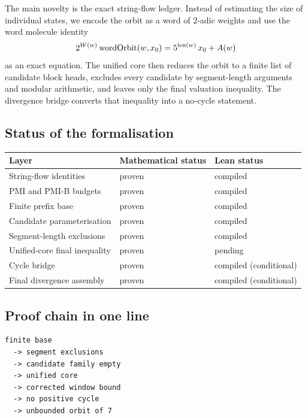 The main novelty is the exact string-flow ledger.  Instead of estimating
the size of individual states, we encode the orbit as a word of
2-adic weights and use the word molecule identity
\begin{equation*}
  2^{W(w)}\,\mathrm{wordOrbit}(w,x_0)
    =5^{\operatorname{len}(w)}\,x_0+A(w)
\end{equation*}
as an exact equation.  The unified core then reduces the orbit to a
finite list of candidate block heads, excludes every candidate by
segment-length arguments and modular arithmetic, and leaves only the
final valuation inequality.  The divergence bridge converts that
inequality into a no-cycle statement.

\subsection{Status of the formalisation}

\begin{center}
\small
\begin{tabular}{@{}p{}p{}p{}@{}}
\toprule
Layer & Mathematical status & Lean status \\
\midrule
String-flow identities & proven & compiled \\
PMI and PMI-B budgets & proven & compiled \\
Finite prefix base & proven & compiled \\
Candidate parameterisation & proven & compiled \\
Segment-length exclusions & proven & compiled \\
Unified-core final inequality & proven & pending \\
Cycle bridge & proven & compiled (conditional) \\
Final divergence assembly & proven & compiled (conditional) \\
\bottomrule
\end{tabular}
\end{center}

\subsection{Proof chain in one line}

\begin{verbatim}
finite base
  -> segment exclusions
  -> candidate family empty
  -> unified core
  -> corrected window bound
  -> no positive cycle
  -> unbounded orbit of 7
\end{verbatim}

